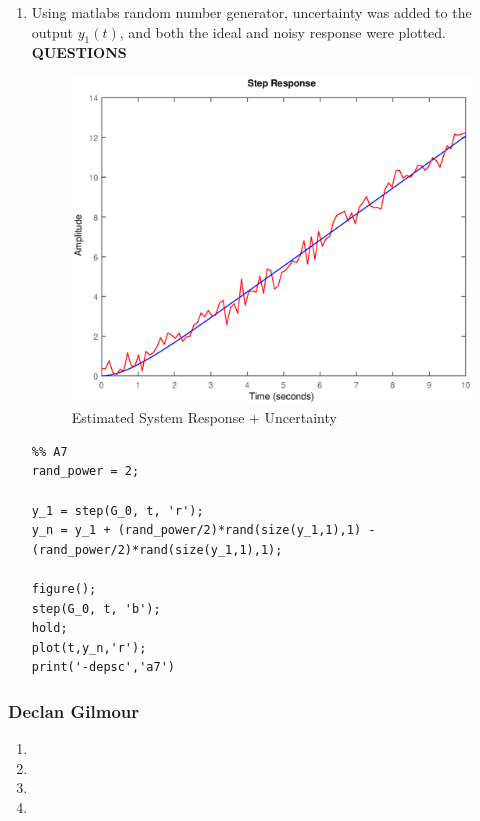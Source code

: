 \documentclass[11pt,a4paper]{article}
\begin{document}
\begin{enumerate}
    
    \pagebreak
    \item Using matlabs random number generator, uncertainty was added to the output $y_1(t)$, and both the ideal and noisy response were plotted. \textbf{QUESTIONS}
    \begin{figure}[H]
	\centering
	\includegraphics[width=.8\textwidth]{PreLach/a7.eps}
	\caption{\label{fig:rand}Estimated System Response + Uncertainty}
	\end{figure}
    \begin{lstlisting}
%% A7
rand_power = 2;

y_1 = step(G_0, t, 'r');
y_n = y_1 + (rand_power/2)*rand(size(y_1,1),1) - (rand_power/2)*rand(size(y_1,1),1);

figure();
step(G_0, t, 'b');
hold;
plot(t,y_n,'r');
print('-depsc','a7')

	\end{lstlisting}
    
\end{enumerate}








\pagebreak
\subsubsection{Declan Gilmour}
\begin{enumerate}
	\item
	\item
	\item
	\item
\end{enumerate}
\end{document}
